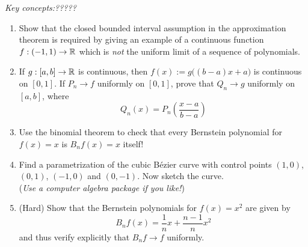 \begin{exercises}
	\emph{Key concepts:\quad ?????}

	\begin{enumerate}
	  \item Show that the closed bounded interval assumption in the approximation theorem is required by giving an example of a continuous function $f:(-1,1)\to\mathbb{R}$ which is \emph{not} the uniform limit of a sequence of polynomials.
	  
	  \item If $g:[a,b]\to\mathbb{R}$ is continuous, then $f(x):=g\bigl((b-a)x+a\bigr)$ is continuous on $[0,1]$. If $P_n\to f$ uniformly on $[0,1]$, prove that $Q_n\to g$ uniformly on $[a,b]$, where
		\[Q_n(x)= P_n\left(\frac{x-a}{b-a}\right)\]
	
		\item Use the binomial theorem to check that every Bernstein polynomial for $f(x)=x$ is $B_nf(x)=x$ itself!
	  
		\item Find a parametrization of the cubic Bézier curve with control points $(1,0)$, $(0,1)$, $(-1,0)$ and $(0,-1)$. Now sketch the curve.\\
		(\emph{Use a computer algebra package if you like!})
		
		\item (Hard) Show that the Bernstein polynomials for $f(x)=x^2$ are given by 
		\[B_nf(x)=\frac 1nx+\frac{n-1}nx^2\]
		and thus verify explicitly that $B_nf\to f$ uniformly.
	\end{enumerate}
\end{exercises}

\fi
